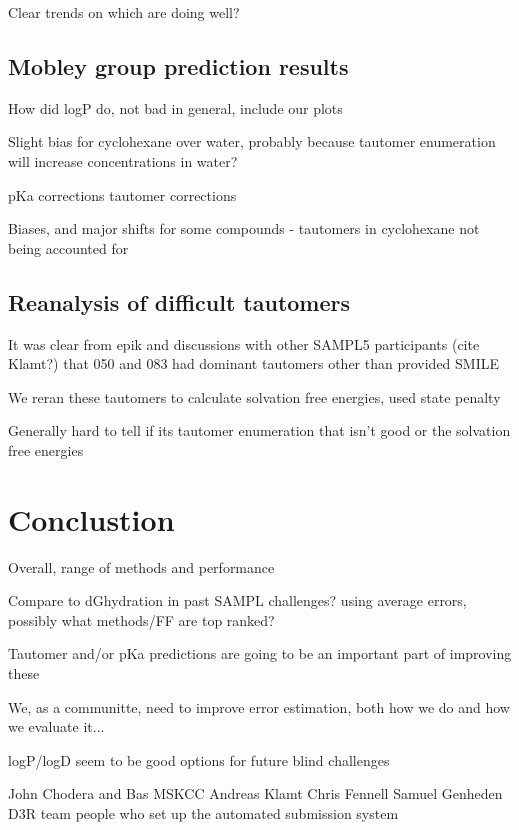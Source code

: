 Clear trends on which are doing well? 

\subsection{Mobley group prediction results}
\label{results:5}
How did logP do, not bad in general, include our plots

Slight bias for cyclohexane over water, probably because tautomer enumeration will increase concentrations in water?

pKa corrections
tautomer corrections

Biases, and major shifts for some compounds - tautomers in cyclohexane not being accounted for

\subsection{Reanalysis of difficult tautomers} %
\label{results:6}
It was clear from epik and discussions with other SAMPL5 participants (cite Klamt?)  that 050 and 083 had dominant tautomers other than provided SMILE

We reran these tautomers to calculate solvation free energies, used state penalty %

Generally hard to tell if its tautomer enumeration that isn't good or the solvation free energies

\section{Conclustion}
\label{conclusions}

Overall, range of methods and performance

Compare to dGhydration in past SAMPL challenges? using average errors, possibly what methods/FF are top ranked?

Tautomer and/or pKa predictions are going to be an important part of improving these

We, as a communitte, need to improve error estimation, both how we do and how we evaluate it...

logP/logD seem to be good options for future blind challenges

\begin{acknowledgements} %
John Chodera and Bas MSKCC
Andreas Klamt
Chris Fennell
Samuel Genheden
D3R team
people who set up the automated submission system %


\end{acknowledgements}

